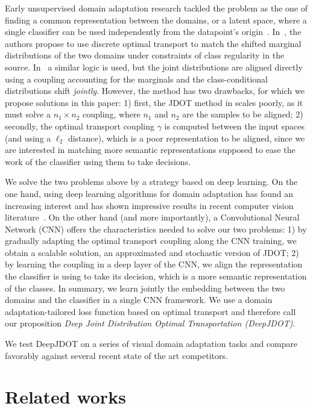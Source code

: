 \documentclass[runningheads]{llncs}
\begin{document}
Early unsupervised domain adaptation research tackled the problem as the one of finding a common representation between the domains, or a latent space, where a single classifier can be used independently from the datapoint's origin~\cite{saenko10,gopalan11}. In~\cite{Cou17}, the authors propose to use discrete optimal transport to match the shifted marginal distributions of the two domains under constraints of class regularity in the source. In~\cite{courty2017joint} a similar logic is used, but the joint distributions are aligned directly using a coupling accounting for the marginals and the class-conditional distributions shift \emph{jointly}. However, the method has two drawbacks, for which we propose solutions in this paper: 1) first, the JDOT method in \cite{courty2017joint} scales poorly, as it must solve a $n_1 \times n_2$ coupling, where $n_1$ and $n_2$ are the samples to be aligned; 2) secondly, the optimal transport coupling $\gamma$ is computed between the input spaces (and using a $\ell_2$ distance), which is a poor representation to be aligned, since we are interested in matching more semantic representations supposed to ease the work of the classifier using them to take decisions.

We solve the two problems above by a strategy based on deep learning. On the one hand, using deep learning algorithms for domain adaptation has found an increasing interest and has shown impressive results in recent computer vision literature~\cite{deepcoral,LEL,Ganin2016,CoGAN}. On the other hand (and more importantly), a Convolutional Neural Network (CNN) offers the characteristics needed to solve our two problems:  1) by gradually adapting the optimal transport coupling along the CNN training, we obtain a scalable solution, an approximated and stochastic version of JDOT; 2) by learning the coupling in a deep layer of the CNN, we align the representation the classifier is using to take its decision, which is a more semantic representation of the classes. In summary, we learn jointly the embedding between the two domains and the classifier in a single CNN framework. We use a domain adaptation-tailored loss function based on optimal transport and therefore call our proposition \emph{Deep Joint Distribution Optimal Transportation (DeepJDOT)}.

We test DeepJDOT on a series of visual domain adaptation tasks and compare favorably against several recent state of the art competitors.


\section{Related works}
\label{sec:rw}
\end{document}
